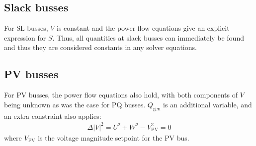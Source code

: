 \documentclass[11pt]{article}
\newcommand{\Vr}{\ensuremath{U}}
\newcommand{\Vi}{\ensuremath{W}}
\begin{document}
\subsection{Slack busses}
For SL busses, $V$ is constant and the power flow equations give an explicit expression for $S$. Thus, all quantities at slack busses can immediately be found and thus they are considered constants in any solver equations.
\subsection{PV busses}
For PV busses, the power flow equations also hold, with both components of $V$ being unknown as was the case for PQ busses. $Q_{\text{gen}}$ is an additional variable, and an extra constraint also applies:
\begin{align}
\Delta |V|^2 = \Vr^2 + \Vi^2 - V_\text{PV}^2 = 0
\label{EQ_POWERFLOW_PV_CONSTRAINT}
\end{align}
where $V_{\text{PV}}$ is the voltage magnitude setpoint for the PV bus.
\end{document}
